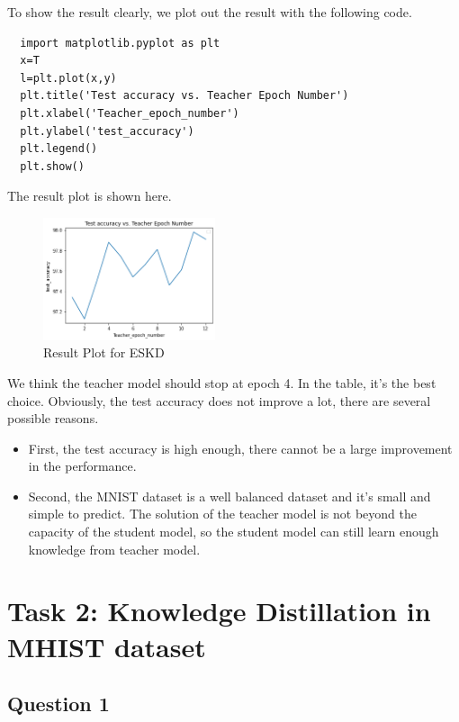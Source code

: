 \documentclass[conference]{IEEEtran}
\begin{document}
  To show the result clearly, we plot out the result with the following code.
  \begin{lstlisting}
  import matplotlib.pyplot as plt
  x=T
  l=plt.plot(x,y)
  plt.title('Test accuracy vs. Teacher Epoch Number')
  plt.xlabel('Teacher_epoch_number')
  plt.ylabel('test_accuracy')
  plt.legend()
  plt.show()
  \end{lstlisting}
  The result plot is shown here. 
  \begin{figure}[h] 
      \centering
      \includegraphics[width=0.45\textwidth]{./graphs/T1Q13.png}
      \caption{Result Plot for ESKD}
      \label{Fig.t1q3e}
  \end{figure}
  We think the teacher model should stop at epoch 4. In the table, it's the best choice. Obviously, the test accuracy does not improve a lot, there are several possible reasons.
  \begin{itemize}
    \item First, the test accuracy is high enough, there cannot be a large improvement in the performance.
    \item Second, the MNIST dataset is a well balanced dataset and it's small and simple to predict. The solution of the teacher model is not beyond the capacity of the student model, so the student model can still learn enough knowledge from teacher model.
  \end{itemize}
\section{Task 2: Knowledge Distillation in MHIST dataset}

\subsection{Question 1}
\end{document}
